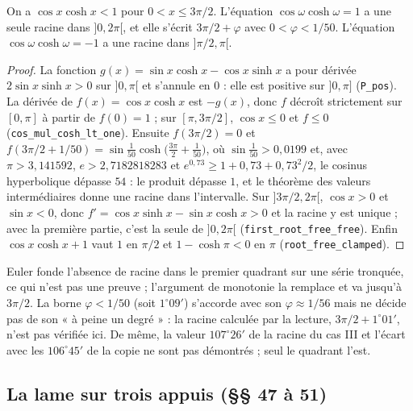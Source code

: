 \begin{enonce}
On a $\cos x\cosh x < 1$ pour $0 < x \leq 3\pi/2$. L'équation $\cos\omega\cosh\omega = 1$ a une seule racine dans $]0, 2\pi[$, et elle s'écrit $3\pi/2 + \varphi$ avec $0 < \varphi < 1/50$. L'équation $\cos\omega\cosh\omega = -1$ a une racine dans $]\pi/2, \pi[$.
\end{enonce}

\begin{proof}
La fonction $g(x) = \sin x\cosh x - \cos x\sinh x$ a pour dérivée $2\sin x\sinh x > 0$ sur $]0, \pi[$ et s'annule en $0$ : elle est positive sur $]0, \pi]$ (\texttt{P\_pos}). La dérivée de $f(x) = \cos x\cosh x$ est $-g(x)$, donc $f$ décroît strictement sur $[0, \pi]$ à partir de $f(0) = 1$ ; sur $[\pi, 3\pi/2]$, $\cos x \leq 0$ et $f \leq 0$ (\texttt{cos\_mul\_cosh\_lt\_one}). Ensuite $f(3\pi/2) = 0$ et $f(3\pi/2 + 1/50) = \sin\frac1{50}\cosh\bigl(\frac{3\pi}2 + \frac1{50}\bigr)$, où $\sin\frac1{50} > 0{,}0199$ et, avec $\pi > 3{,}141592$, $e > 2{,}7182818283$ et $e^{0{,}73} \geq 1 + 0{,}73 + 0{,}73^2/2$, le cosinus hyperbolique dépasse $54$ : le produit dépasse $1$, et le théorème des valeurs intermédiaires donne une racine dans l'intervalle. Sur $]3\pi/2, 2\pi[$, $\cos x > 0$ et $\sin x < 0$, donc $f' = \cos x\sinh x - \sin x\cosh x > 0$ et la racine y est unique ; avec la première partie, c'est la seule de $]0, 2\pi[$ (\texttt{first\_root\_free\_free}). Enfin $\cos x\cosh x + 1$ vaut $1$ en $\pi/2$ et $1 - \cosh\pi < 0$ en $\pi$ (\texttt{root\_free\_clamped}).
\end{proof}

\begin{remarque}
Euler fonde l'absence de racine dans le premier quadrant sur une série tronquée, ce qui n'est pas une preuve ; l'argument de monotonie la remplace et va jusqu'à $3\pi/2$. La borne $\varphi < 1/50$ (soit $1^\circ 09'$) s'accorde avec son $\varphi \approx 1/56$ mais ne décide pas de son « à peine un degré » : la racine calculée par la lecture, $3\pi/2 + 1^\circ 01'$, n'est pas vérifiée ici. De même, la valeur $107^\circ 26'$ de la racine du cas III et l'écart avec les $106^\circ 45'$ de la copie ne sont pas démontrés ; seul le quadrant l'est.
\end{remarque}

\subsection*{La lame sur trois appuis (§§ 47 à 51)}

